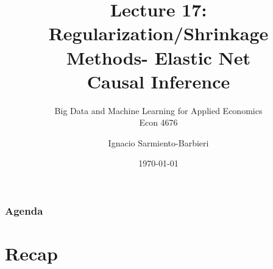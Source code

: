\documentclass[
  shownotes,
  xcolor={svgnames},
  hyperref={colorlinks,citecolor=DarkBlue,linkcolor=DarkRed,urlcolor=DarkBlue}
  , aspectratio=169]{beamer}
\begin{document}
 
\title[Lecture 17]{Lecture 17: \\ Regularization/Shrinkage Methods- Elastic Net  \\ Causal Inference}
\subtitle{Big Data and Machine Learning for Applied Economics \\ Econ 4676}
\date{\today}

\author[Sarmiento-Barbieri]{Ignacio Sarmiento-Barbieri}


\begin{frame}[noframenumbering]
\maketitle
\end{frame}





\begin{frame}
\frametitle{Agenda}

\tableofcontents

\end{frame}

\section{Recap }
\end{document}
